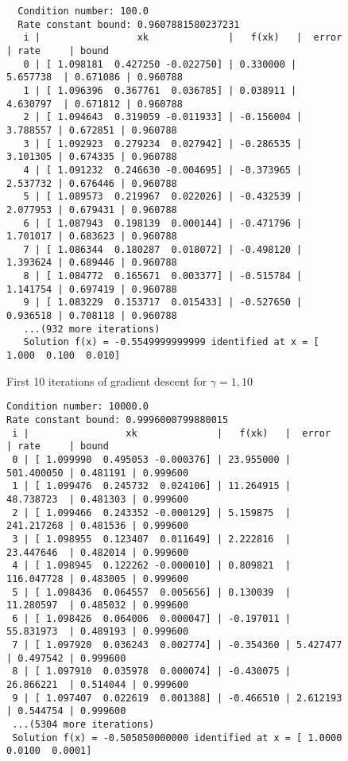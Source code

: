 \begin{solution}
\begin{figure}[h]
\begin{verbatim}
  Condition number: 100.0
  Rate constant bound: 0.9607881580237231
   i |                 xk              |   f(xk)   |  error   | rate     | bound
   0 | [ 1.098181  0.427250 -0.022750] | 0.330000 | 5.657738  | 0.671086 | 0.960788
   1 | [ 1.096396  0.367761  0.036785] | 0.038911 | 4.630797  | 0.671812 | 0.960788
   2 | [ 1.094643  0.319059 -0.011933] | -0.156004 | 3.788557 | 0.672851 | 0.960788
   3 | [ 1.092923  0.279234  0.027942] | -0.286535 | 3.101305 | 0.674335 | 0.960788
   4 | [ 1.091232  0.246630 -0.004695] | -0.373965 | 2.537732 | 0.676446 | 0.960788
   5 | [ 1.089573  0.219967  0.022026] | -0.432539 | 2.077953 | 0.679431 | 0.960788
   6 | [ 1.087943  0.198139  0.000144] | -0.471796 | 1.701017 | 0.683623 | 0.960788
   7 | [ 1.086344  0.180287  0.018072] | -0.498120 | 1.393624 | 0.689446 | 0.960788
   8 | [ 1.084772  0.165671  0.003377] | -0.515784 | 1.141754 | 0.697419 | 0.960788
   9 | [ 1.083229  0.153717  0.015433] | -0.527650 | 0.936518 | 0.708118 | 0.960788
   ...(932 more iterations)
   Solution f(x) = -0.5549999999999 identified at x = [ 1.000  0.100  0.010]
        \end{verbatim}
        \caption{First 10 iterations of gradient descent for $\gamma = 1, 10$}
        \label{fig:gamma_1_10}
    \end{figure}
    \pagebreak
    \begin{figure}[h]
        \centering
        \begin{verbatim}
Condition number: 10000.0
Rate constant bound: 0.9996000799880015
 i |                 xk              |   f(xk)   |  error     | rate     | bound
 0 | [ 1.099990  0.495053 -0.000376] | 23.955000 | 501.400050 | 0.481191 | 0.999600
 1 | [ 1.099476  0.245732  0.024106] | 11.264915 | 48.738723  | 0.481303 | 0.999600
 2 | [ 1.099466  0.243352 -0.000129] | 5.159875  | 241.217268 | 0.481536 | 0.999600
 3 | [ 1.098955  0.123407  0.011649] | 2.222816  | 23.447646  | 0.482014 | 0.999600
 4 | [ 1.098945  0.122262 -0.000010] | 0.809821  | 116.047728 | 0.483005 | 0.999600
 5 | [ 1.098436  0.064557  0.005656] | 0.130039  | 11.280597  | 0.485032 | 0.999600
 6 | [ 1.098426  0.064006  0.000047] | -0.197011 | 55.831973  | 0.489193 | 0.999600
 7 | [ 1.097920  0.036243  0.002774] | -0.354360 | 5.427477   | 0.497542 | 0.999600
 8 | [ 1.097910  0.035978  0.000074] | -0.430075 | 26.866221  | 0.514044 | 0.999600
 9 | [ 1.097407  0.022619  0.001388] | -0.466510 | 2.612193   | 0.544754 | 0.999600
 ...(5304 more iterations)
 Solution f(x) = -0.505050000000 identified at x = [ 1.0000  0.0100  0.0001]


\end{verbatim}
\end{figure}
\end{solution}

